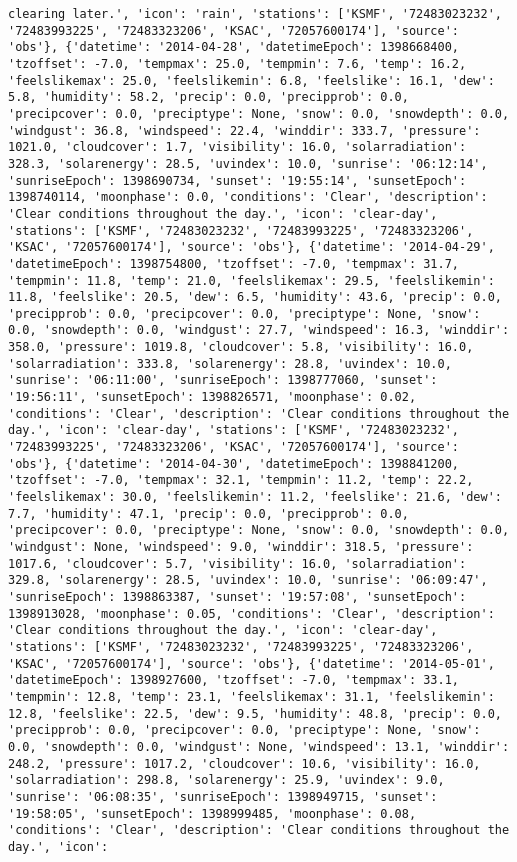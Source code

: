\documentclass[
  letterpaper,
  DIV=11,
  numbers=noendperiod]{scrartcl}
\begin{document}
\begin{verbatim}
clearing later.', 'icon': 'rain', 'stations': ['KSMF', '72483023232', '72483993225', '72483323206', 'KSAC', '72057600174'], 'source': 'obs'}, {'datetime': '2014-04-28', 'datetimeEpoch': 1398668400, 'tzoffset': -7.0, 'tempmax': 25.0, 'tempmin': 7.6, 'temp': 16.2, 'feelslikemax': 25.0, 'feelslikemin': 6.8, 'feelslike': 16.1, 'dew': 5.8, 'humidity': 58.2, 'precip': 0.0, 'precipprob': 0.0, 'precipcover': 0.0, 'preciptype': None, 'snow': 0.0, 'snowdepth': 0.0, 'windgust': 36.8, 'windspeed': 22.4, 'winddir': 333.7, 'pressure': 1021.0, 'cloudcover': 1.7, 'visibility': 16.0, 'solarradiation': 328.3, 'solarenergy': 28.5, 'uvindex': 10.0, 'sunrise': '06:12:14', 'sunriseEpoch': 1398690734, 'sunset': '19:55:14', 'sunsetEpoch': 1398740114, 'moonphase': 0.0, 'conditions': 'Clear', 'description': 'Clear conditions throughout the day.', 'icon': 'clear-day', 'stations': ['KSMF', '72483023232', '72483993225', '72483323206', 'KSAC', '72057600174'], 'source': 'obs'}, {'datetime': '2014-04-29', 'datetimeEpoch': 1398754800, 'tzoffset': -7.0, 'tempmax': 31.7, 'tempmin': 11.8, 'temp': 21.0, 'feelslikemax': 29.5, 'feelslikemin': 11.8, 'feelslike': 20.5, 'dew': 6.5, 'humidity': 43.6, 'precip': 0.0, 'precipprob': 0.0, 'precipcover': 0.0, 'preciptype': None, 'snow': 0.0, 'snowdepth': 0.0, 'windgust': 27.7, 'windspeed': 16.3, 'winddir': 358.0, 'pressure': 1019.8, 'cloudcover': 5.8, 'visibility': 16.0, 'solarradiation': 333.8, 'solarenergy': 28.8, 'uvindex': 10.0, 'sunrise': '06:11:00', 'sunriseEpoch': 1398777060, 'sunset': '19:56:11', 'sunsetEpoch': 1398826571, 'moonphase': 0.02, 'conditions': 'Clear', 'description': 'Clear conditions throughout the day.', 'icon': 'clear-day', 'stations': ['KSMF', '72483023232', '72483993225', '72483323206', 'KSAC', '72057600174'], 'source': 'obs'}, {'datetime': '2014-04-30', 'datetimeEpoch': 1398841200, 'tzoffset': -7.0, 'tempmax': 32.1, 'tempmin': 11.2, 'temp': 22.2, 'feelslikemax': 30.0, 'feelslikemin': 11.2, 'feelslike': 21.6, 'dew': 7.7, 'humidity': 47.1, 'precip': 0.0, 'precipprob': 0.0, 'precipcover': 0.0, 'preciptype': None, 'snow': 0.0, 'snowdepth': 0.0, 'windgust': None, 'windspeed': 9.0, 'winddir': 318.5, 'pressure': 1017.6, 'cloudcover': 5.7, 'visibility': 16.0, 'solarradiation': 329.8, 'solarenergy': 28.5, 'uvindex': 10.0, 'sunrise': '06:09:47', 'sunriseEpoch': 1398863387, 'sunset': '19:57:08', 'sunsetEpoch': 1398913028, 'moonphase': 0.05, 'conditions': 'Clear', 'description': 'Clear conditions throughout the day.', 'icon': 'clear-day', 'stations': ['KSMF', '72483023232', '72483993225', '72483323206', 'KSAC', '72057600174'], 'source': 'obs'}, {'datetime': '2014-05-01', 'datetimeEpoch': 1398927600, 'tzoffset': -7.0, 'tempmax': 33.1, 'tempmin': 12.8, 'temp': 23.1, 'feelslikemax': 31.1, 'feelslikemin': 12.8, 'feelslike': 22.5, 'dew': 9.5, 'humidity': 48.8, 'precip': 0.0, 'precipprob': 0.0, 'precipcover': 0.0, 'preciptype': None, 'snow': 0.0, 'snowdepth': 0.0, 'windgust': None, 'windspeed': 13.1, 'winddir': 248.2, 'pressure': 1017.2, 'cloudcover': 10.6, 'visibility': 16.0, 'solarradiation': 298.8, 'solarenergy': 25.9, 'uvindex': 9.0, 'sunrise': '06:08:35', 'sunriseEpoch': 1398949715, 'sunset': '19:58:05', 'sunsetEpoch': 1398999485, 'moonphase': 0.08, 'conditions': 'Clear', 'description': 'Clear conditions throughout the day.', 'icon': 
\end{verbatim}
\end{document}
